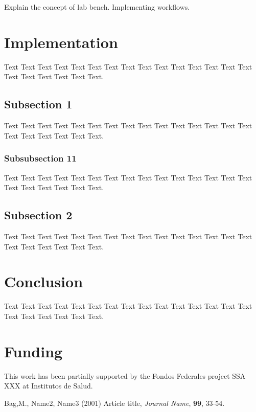 \documentclass{bioinfo}
\begin{document}
Explain the concept of lab bench.
Implementing workflows.

\section{Implementation}

Text Text Text Text Text Text Text Text
Text Text Text Text Text Text Text Text Text Text Text Text Text.

\subsection{Subsection 1}

Text Text Text Text Text Text  Text Text Text Text Text Text Text
Text Text  Text Text Text Text Text Text.

\subsubsection{Subsubsection 11}

Text Text Text Text Text Text  Text Text Text Text Text Text Text
Text Text  Text Text Text Text Text Text.

\subsection{Subsection 2}

Text Text Text Text Text Text  Text Text Text Text Text Text Text
Text Text  Text Text Text Text Text Text.

\section{Conclusion}

Text Text Text Text Text Text  Text Text Text
Text Text Text Text Text Text  Text Text Text Text Text Text.

\section*{Funding}

This work has been partially supported by the Fondos Federales project SSA XXX at Institutos de
Salud.\vspace*{-12pt}

%
%
%
%
%
%
%
%
%

\begin{thebibliography}{}

Bag,M., Name2, Name3 (2001) Article title, {\it Journal Name}, {\bf 99}, 33-54.

\end{thebibliography}
\end{document}
